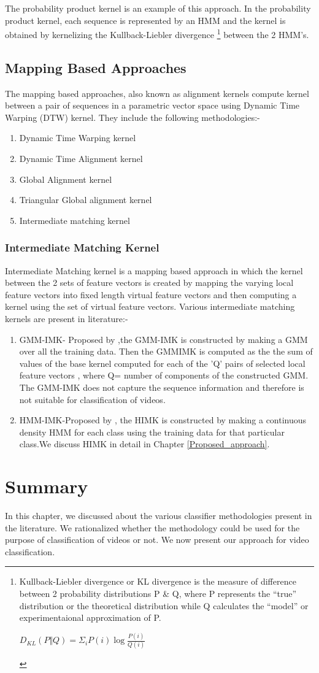 The probability product kernel is an example of this approach. In the probability product kernel, each sequence is represented by an HMM and the kernel is obtained by kernelizing the Kullback-Liebler divergence
\footnote{Kullback-Liebler divergence or KL divergence is the measure of difference between 2 probability distributions P \& Q, where P represents the ``true'' distribution or the theoretical distribution while Q calculates the ``model'' or experimentaional approximation of P.
\begin{center}
$D_{KL}(P \Vert Q)=\Sigma{_i} P(i) \log{\frac{P(i)}{Q(i)}}$
\end{center}
}
between the 2 HMM's.

\subsection{Mapping Based Approaches}
The mapping based approaches, also known as alignment kernels compute kernel between a pair of sequences in a parametric vector space using Dynamic Time Warping (DTW) kernel. They include the following methodologies:-
\begin{enumerate}
\item Dynamic Time Warping kernel
\item Dynamic Time Alignment kernel
\item Global Alignment kernel
\item Triangular Global alignment kernel
\item Intermediate matching kernel
\end{enumerate} 

\subsubsection{Intermediate Matching Kernel}
Intermediate Matching kernel is a mapping based approach in which the kernel between the 2 sets of feature vectors is created by mapping the varying local feature vectors into fixed length virtual feature vectors and then computing a kernel using the set of virtual feature vectors. Various intermediate matching kernels are present in literature:- 
\begin{enumerate}
\item GMM-IMK- Proposed by \citet{GMMIMK},the GMM-IMK is constructed by making a GMM over all the training data. Then the GMMIMK is computed as the the sum of values of the base kernel computed for each of the 'Q' pairs of selected local feature vectors , where Q= number of components of the constructed GMM. The GMM-IMK does not capture the sequence information and therefore is not suitable for classification of videos.
\item HMM-IMK-Proposed by \citet{HIMK}, the HIMK is constructed by making a continuous density HMM for each class using the training data for that particular class.We discuss HIMK in detail in Chapter \ref{Proposed_approach}.
\end{enumerate}

\section{Summary}
In this chapter, we discussed about the various classifier methodologies present in the literature. We rationalized whether the methodology could be used for the purpose of classification of videos or not. We now present our approach for video classification.
%
